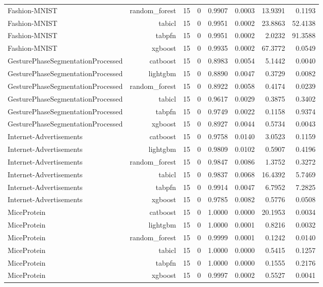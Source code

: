 \begin{table}[htbp]
\begin{tabular}{lrrrrrrr}
Fashion-MNIST & random\_forest & 15 & 0 & 0.9907 & 0.0003 & 13.9391 & 0.1193 \\
Fashion-MNIST & tabicl & 15 & 0 & 0.9951 & 0.0002 & 23.8863 & 52.4138 \\
Fashion-MNIST & tabpfn & 15 & 0 & 0.9951 & 0.0002 & 2.0232 & 91.3588 \\
Fashion-MNIST & xgboost & 15 & 0 & 0.9935 & 0.0002 & 67.3772 & 0.0549 \\
GesturePhaseSegmentationProcessed & catboost & 15 & 0 & 0.8983 & 0.0054 & 5.1442 & 0.0040 \\
GesturePhaseSegmentationProcessed & lightgbm & 15 & 0 & 0.8890 & 0.0047 & 0.3729 & 0.0082 \\
GesturePhaseSegmentationProcessed & random\_forest & 15 & 0 & 0.8922 & 0.0058 & 0.4174 & 0.0239 \\
GesturePhaseSegmentationProcessed & tabicl & 15 & 0 & 0.9617 & 0.0029 & 0.3875 & 0.3402 \\
GesturePhaseSegmentationProcessed & tabpfn & 15 & 0 & 0.9749 & 0.0022 & 0.1158 & 0.9374 \\
GesturePhaseSegmentationProcessed & xgboost & 15 & 0 & 0.8927 & 0.0044 & 0.5734 & 0.0043 \\
Internet-Advertisements & catboost & 15 & 0 & 0.9758 & 0.0140 & 3.0523 & 0.1159 \\
Internet-Advertisements & lightgbm & 15 & 0 & 0.9809 & 0.0102 & 0.5907 & 0.4196 \\
Internet-Advertisements & random\_forest & 15 & 0 & 0.9847 & 0.0086 & 1.3752 & 0.3272 \\
Internet-Advertisements & tabicl & 15 & 0 & 0.9837 & 0.0068 & 16.4392 & 5.7469 \\
Internet-Advertisements & tabpfn & 15 & 0 & 0.9914 & 0.0047 & 6.7952 & 7.2825 \\
Internet-Advertisements & xgboost & 15 & 0 & 0.9785 & 0.0082 & 0.5776 & 0.0508 \\
MiceProtein & catboost & 15 & 0 & 1.0000 & 0.0000 & 20.1953 & 0.0034 \\
MiceProtein & lightgbm & 15 & 0 & 1.0000 & 0.0001 & 0.8216 & 0.0032 \\
MiceProtein & random\_forest & 15 & 0 & 0.9999 & 0.0001 & 0.1242 & 0.0140 \\
MiceProtein & tabicl & 15 & 0 & 1.0000 & 0.0000 & 0.5415 & 0.1257 \\
MiceProtein & tabpfn & 15 & 0 & 1.0000 & 0.0000 & 0.1555 & 0.2176 \\
MiceProtein & xgboost & 15 & 0 & 0.9997 & 0.0002 & 0.5527 & 0.0041 \\

\end{tabular}
\end{table}
